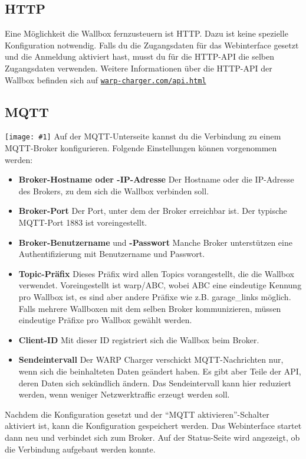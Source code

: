 \documentclass[a4paper,10pt]{article}
\newcommand{\gfx}[1]{\texttt{[image: \#1]}}
\newcommand\rurl[2]{%
  \href{#1}{\nolinkurl{#2}}%
}
\begin{document}
\begin{multicols*}{2}
    \subsection{HTTP}\label{http-interface}
    Eine Möglichkeit die Wallbox fernzusteuern ist HTTP. Dazu ist keine
    spezielle Konfiguration notwendig. Falls du die Zugangsdaten für das Webinterface gesetzt und die Anmeldung aktiviert hast, musst du
    für die HTTP-API die selben Zugangsdaten verwenden.
    Weitere Informationen über die HTTP-API der Wallbox befinden sich auf \rurl{https://warp-charger.com/api.html}{warp-charger.com/api.html}


    \subsection{MQTT}\label{mqtt-interface}

    \gfx{./img_warp2/resized/web_mqtt}
    Auf der MQTT-Unterseite kannst du die Verbindung zu einem MQTT-Broker konfigurieren. Folgende Einstellungen können vorgenommen werden:
    \begin{itemize}
        \item \textbf{Broker-Hostname oder -IP-Adresse} Der Host\-name oder die IP-Adresse des Brokers, zu dem sich die Wallbox verbinden soll.
        \item \textbf{Broker-Port} Der Port, unter dem der Broker erreichbar ist. Der typische MQTT-Port 1883 ist voreingestellt.
        \item \textbf{Broker-Benutzername} und \textbf{-Passwort} Manche Broker unterstützen eine Authentifizierung mit Benutzername und Passwort.
        \item \textbf{Topic-Präfix} Dieses Präfix wird allen Topics vorangestellt, die die Wallbox verwendet.
              Voreingestellt ist warp/ABC, wobei ABC eine eindeutige Kennung pro Wallbox ist,
              es sind aber andere Präfixe wie z.B. garage\_links möglich.
              Falls mehrere Wallboxen mit dem selben Broker kommunizieren,
              müssen eindeutige Präfixe pro Wallbox gewählt werden.
        \item \textbf{Client-ID} Mit dieser ID registriert sich die Wallbox beim Broker.
        \item \textbf{Sendeintervall} Der WARP Charger verschickt MQTT-Nachrichten nur, wenn sich die beinhalteten Daten geändert haben.
            Es gibt aber Teile der API, deren Daten sich sekündlich ändern. Das Sendeintervall kann hier reduziert werden, wenn weniger Netzwerktraffic
            erzeugt werden soll.
    \end{itemize}
    Nachdem die Konfiguration gesetzt und der \enquote{MQTT aktivieren}-Schalter aktiviert ist, kann die Konfiguration gespeichert werden.
    Das Webinterface startet dann neu und verbindet sich zum Broker.
    Auf der Status-Seite wird angezeigt, ob die Verbindung aufgebaut werden konnte.


\end{multicols*}
\end{document}
